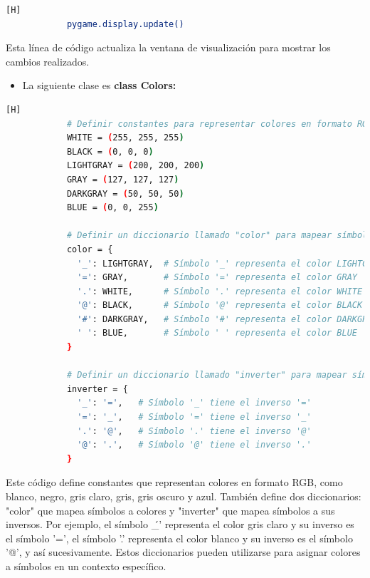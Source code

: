 \documentclass{article}
\begin{document}
	\begin{lstlisting}[language=bash,caption={Línea final de código}][H]
            pygame.display.update()
	\end{lstlisting}
Esta línea de código actualiza la ventana de visualización para mostrar los cambios realizados.

\begin{itemize}	
		\item La siguiente clase es \textbf{class Colors:} 
	\end{itemize}
 
	\begin{lstlisting}[language=bash,caption={Clase Color}][H]
            # Definir constantes para representar colores en formato RGB
            WHITE = (255, 255, 255)
            BLACK = (0, 0, 0)
            LIGHTGRAY = (200, 200, 200)
            GRAY = (127, 127, 127)
            DARKGRAY = (50, 50, 50)
            BLUE = (0, 0, 255)
            
            # Definir un diccionario llamado "color" para mapear símbolos a colores
            color = {
              '_': LIGHTGRAY,  # Símbolo '_' representa el color LIGHTGRAY
              '=': GRAY,       # Símbolo '=' representa el color GRAY
              '.': WHITE,      # Símbolo '.' representa el color WHITE
              '@': BLACK,      # Símbolo '@' representa el color BLACK
              '#': DARKGRAY,   # Símbolo '#' representa el color DARKGRAY
              ' ': BLUE,       # Símbolo ' ' representa el color BLUE
            }
            
            # Definir un diccionario llamado "inverter" para mapear símbolos a sus inversos
            inverter = {
              '_': '=',   # Símbolo '_' tiene el inverso '='
              '=': '_',   # Símbolo '=' tiene el inverso '_'
              '.': '@',   # Símbolo '.' tiene el inverso '@'
              '@': '.',   # Símbolo '@' tiene el inverso '.'
            }
	\end{lstlisting}
Este código define constantes que representan colores en formato RGB, como blanco, negro, gris claro, gris, gris oscuro y azul. También define dos diccionarios: "color" que mapea símbolos a colores y "inverter" que mapea símbolos a sus inversos. Por ejemplo, el símbolo \'\_' representa el color gris claro y su inverso es el símbolo '=', el símbolo '.' representa el color blanco y su inverso es el símbolo '@', y así sucesivamente. Estos diccionarios pueden utilizarse para asignar colores a símbolos en un contexto específico.
\end{document}
